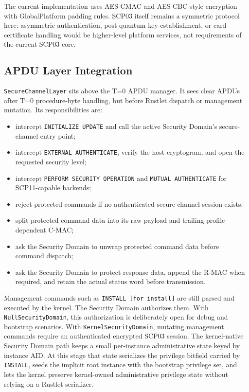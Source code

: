 The current implementation uses AES-CMAC and AES-CBC style encryption with
GlobalPlatform padding rules. SCP03 itself remains a symmetric protocol here:
asymmetric authentication, post-quantum key establishment, or card certificate
handling would be higher-level platform services, not requirements of the
current SCP03 core.

\subsection{APDU Layer Integration}
\label{sec:impl-scp-apdu-layer}

\texttt{SecureChannelLayer} sits above the T=0 APDU manager. It sees clear APDUs
after T=0 procedure-byte handling, but before Rustlet dispatch or management
mutation. Its responsibilities are:

\begin{itemize}
\item intercept \texttt{INITIALIZE UPDATE} and call the active Security
      Domain's secure-channel entry point;
\item intercept \texttt{EXTERNAL AUTHENTICATE}, verify the host cryptogram,
      and open the requested security level;
\item intercept \texttt{PERFORM SECURITY OPERATION} and
      \texttt{MUTUAL AUTHENTICATE} for SCP11-capable backends;
\item reject protected commands if no authenticated secure-channel session
      exists;
\item split protected command data into its raw payload and trailing
      profile-dependent C-MAC;
\item ask the Security Domain to unwrap protected command data before command
      dispatch;
\item ask the Security Domain to protect response data, append the R-MAC when
      required, and retain the actual status word before transmission.
\end{itemize}

Management commands such as \texttt{INSTALL [for install]} are still parsed and
executed by the kernel. The Security Domain authorizes them. With
\texttt{NullSecurityDomain}, this authorization is deliberately open for debug
and bootstrap scenarios. With \texttt{KernelSecurityDomain}, mutating
management commands require an
authenticated encrypted SCP03 session. The kernel-native Security Domain path
keeps a small per-instance administrative state keyed by instance
AID. At this stage that state serializes the privilege bitfield carried by
\texttt{INSTALL}, seeds the implicit root instance with the bootstrap privilege
set, and lets the kernel preserve kernel-owned administrative privilege state
without relying on a Rustlet serializer.

